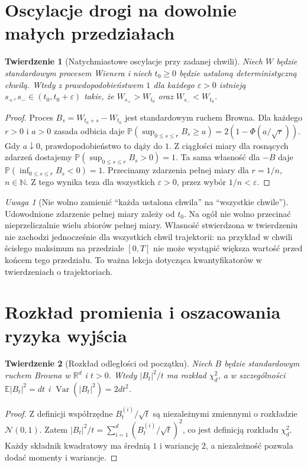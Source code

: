 \documentclass[11pt,a4paper,oneside]{report}
\numberwithin{equation}{chapter}
\theoremstyle{plain}
\newtheorem{twierdzenie}{Twierdzenie}[chapter]
\theoremstyle{definition}
\theoremstyle{remark}
\newtheorem{uwaga}{Uwaga}[chapter]
\newcommand{\R}{\mathbb{R}}
\newcommand{\N}{\mathbb{N}}
\newcommand{\Prob}{\mathbb{P}}
\newcommand{\E}{\mathbb{E}}
\newcommand{\Var}{\operatorname{Var}}
\newcommand{\Normal}{\mathcal{N}}
\begin{document}
\section{Oscylacje drogi na dowolnie małych przedziałach}
\begin{twierdzenie}[Natychmiastowe oscylacje przy zadanej chwili]
Niech $W$ będzie standardowym procesem Wienera i niech
$t_0\ge0$ będzie ustaloną deterministyczną chwilą.
Wtedy z prawdopodobieństwem $1$ dla każdego $\varepsilon>0$
istnieją $s_+,s_-\in(t_0,t_0+\varepsilon)$ takie, że
$W_{s_+}>W_{t_0}$ oraz $W_{s_-}<W_{t_0}$.
\end{twierdzenie}
\begin{proof}
Proces $B_s=W_{t_0+s}-W_{t_0}$ jest standardowym
ruchem Browna. Dla każdego $r>0$ i $a>0$ zasada odbicia
daje
$\Prob(\sup_{0\le s\le r}B_s\ge a)=2(1-\Phi(a/\sqrt r))$.
Gdy $a\downarrow0$, prawdopodobieństwo to dąży do $1$.
Z ciągłości miary dla rosnących zdarzeń dostajemy
$\Prob(\sup_{0\le s\le r}B_s>0)=1$.
Ta sama własność dla $-B$ daje
$\Prob(\inf_{0\le s\le r}B_s<0)=1$.
Przecinamy zdarzenia pełnej miary dla $r=1/n$,
$n\in\N$. Z tego wynika teza dla wszystkich
$\varepsilon>0$, przez wybór $1/n<\varepsilon$.
\end{proof}

\begin{uwaga}[Nie wolno zamienić ``każda ustalona chwila'' na ``wszystkie chwile'']
Udowodnione zdarzenie pełnej miary zależy od $t_0$.
Na ogół nie wolno przecinać nieprzeliczalnie wielu
zbiorów pełnej miary. Własność stwierdzona w twierdzeniu
nie zachodzi jednocześnie dla wszystkich chwil trajektorii:
na przykład w chwili ścisłego maksimum na przedziale
$[0,T]$ nie może wystąpić większa wartość przed końcem
tego przedziału. To ważna lekcja dotycząca kwantyfikatorów
w twierdzeniach o trajektoriach.
\end{uwaga}


\section{Rozkład promienia i oszacowania ryzyka wyjścia}
\begin{twierdzenie}[Rozkład odległości od początku]
Niech $B$ będzie standardowym ruchem Browna w $\R^d$
i $t>0$. Wtedy $|B_t|^2/t$ ma rozkład $\chi^2_d$,
a w szczególności
$\E|B_t|^2=dt$ i $\Var(|B_t|^2)=2dt^2$.
\end{twierdzenie}
\begin{proof}
Z definicji współrzędne $B_t^{(i)}/\sqrt t$ są niezależnymi
zmiennymi o rozkładzie $\Normal(0,1)$. Zatem
$|B_t|^2/t=\sum_{i=1}^d(B_t^{(i)}/\sqrt t)^2$,
co jest definicją rozkładu $\chi^2_d$.
Każdy składnik kwadratowy ma średnią $1$ i wariancję $2$,
a niezależność pozwala dodać momenty i wariancje.
\end{proof}
\end{document}
